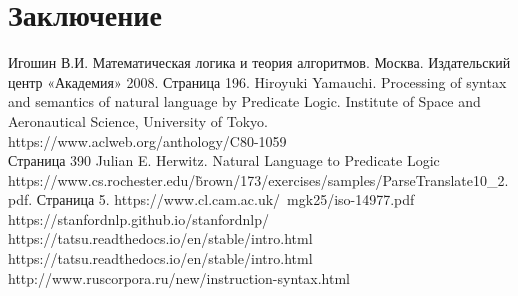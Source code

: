 \documentclass[12pt]{article}
\begin{document}
\newpage
\section*{Заключение}

\newpage
{}
\begin{thebibliography}{}
Игошин В.И. Математическая логика и теория алгоритмов. Москва. Издательский центр «Академия» 2008. Страница 196.
Hiroyuki Yamauchi. Processing of syntax and semantics of natural language by Predicate Logic. Institute of Space and Aeronautical Science, University of Tokyo. 
https://www.aclweb.org/anthology/C80-1059 \\
Страница 390
Julian E. Herwitz. Natural Language to Predicate Logic https://www.cs.rochester.edu/\~brown/173/exercises/samples/ParseTranslate10\_2.pdf. Страница 5.
https://www.cl.cam.ac.uk/~mgk25/iso-14977.pdf
https://stanfordnlp.github.io/stanfordnlp/
https://tatsu.readthedocs.io/en/stable/intro.html
https://tatsu.readthedocs.io/en/stable/intro.html
http://www.ruscorpora.ru/new/instruction-syntax.html





\end{thebibliography}
\end{document}
